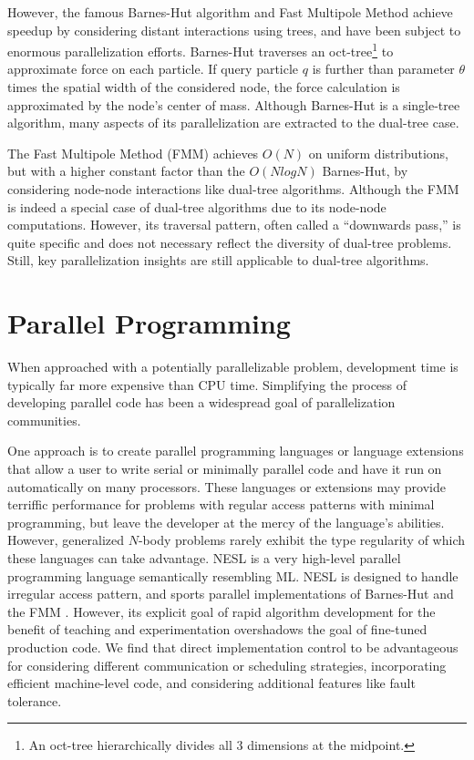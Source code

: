 \documentclass[twoside,leqno,twocolumn]{article}
\begin{document}
However, the famous Barnes-Hut algorithm\cite{barnes_hut} and Fast Multipole Method\cite{greengard_fmm} achieve speedup by considering distant interactions using trees, and have been subject to enormous parallelization efforts.
Barnes-Hut\cite{barnes_hut} traverses an oct-tree\footnote{An oct-tree hierarchically divides all 3 dimensions at the midpoint.} to approximate force on each particle.
If query particle $q$ is further than parameter $\theta$ times the spatial width of the considered node, the force calculation is approximated by the node's center of mass.
Although Barnes-Hut is a single-tree algorithm, many aspects of its parallelization are extracted to the dual-tree case.

The Fast Multipole Method (FMM)\cite{greengard_fmm} achieves $O(N)$ on uniform distributions, but with a higher constant factor than the $O(N log N)$ Barnes-Hut, by considering node-node interactions like dual-tree algorithms.
Although the FMM is indeed a special case of dual-tree algorithms due to its node-node computations.
However, its traversal pattern, often called a ``downwards pass,'' is quite specific and does not necessary reflect the diversity of dual-tree problems.
Still, key parallelization insights are still applicable to dual-tree algorithms.


\section{Parallel Programming}

When approached with a potentially parallelizable problem, development time is typically far more expensive than CPU time.
Simplifying the process of developing parallel code has been a widespread goal of parallelization communities.

One approach is to create parallel programming languages or language extensions that allow a user to write serial or minimally parallel code and have it run on automatically on many processors.
These languages or extensions may provide terriffic performance for problems with regular access patterns with minimal programming, but leave the developer at the mercy of the language's abilities.
However, generalized $N$-body problems rarely exhibit the type regularity of which these languages can take advantage.
NESL is a very high-level parallel programming language semantically resembling ML.
NESL is designed to handle irregular access pattern, and sports parallel implementations of Barnes-Hut and the FMM \cite{blelloch_nbody}.
However, its explicit goal of rapid algorithm development for the benefit of teaching and experimentation overshadows the goal of fine-tuned production code.
We find that direct implementation control to be advantageous for considering different communication or scheduling strategies, incorporating efficient machine-level code, and considering additional features like fault tolerance.
\end{document}
